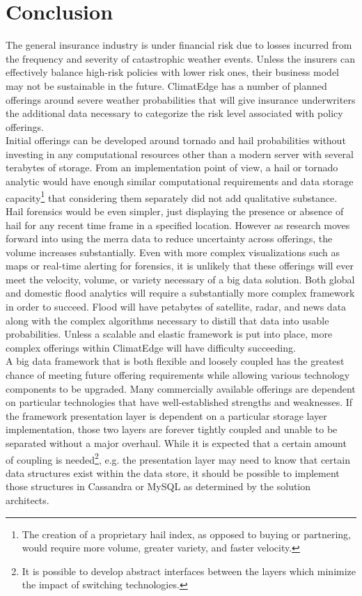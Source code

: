 \section{Conclusion}
The general insurance industry is under financial risk due to losses incurred from the frequency and severity of catastrophic weather events. Unless the insurers can effectively balance high-risk policies with lower risk ones, their business model may not be sustainable in the future. ClimatEdge has a number of planned offerings around severe weather probabilities that will give insurance underwriters the additional data necessary to categorize the risk level associated with policy offerings.\\

Initial offerings can be developed around tornado and hail probabilities without investing in any computational resources other than a modern server with several terabytes of storage. From an implementation point of view, a hail or tornado analytic would have enough similar computational requirements and data storage capacity\footnote{The creation of a proprietary hail index, as opposed to buying or partnering, would require more volume, greater variety, and faster velocity.} that considering them separately did not add qualitative substance. Hail forensics would be even simpler, just displaying the presence or absence of hail for any recent time frame in a specified location. However as research moves forward into using the \gls{merra} data to reduce uncertainty across offerings, the volume increases substantially. Even with more complex visualizations such as maps or real-time alerting for forensics, it is unlikely that these offerings will ever meet the velocity, volume, or variety necessary of a big data solution. Both global and domestic flood analytics will require a substantially more complex framework in order to succeed. Flood will have petabytes of satellite, radar, and news data along with the complex algorithms necessary to distill that data into usable probabilities. Unless a scalable and elastic framework is put into place, more complex offerings within ClimatEdge will have difficulty succeeding.\\

A big data framework that is both flexible and loosely coupled has the greatest chance of meeting future offering requirements while allowing various technology components to be upgraded. Many commercially available offerings are dependent on particular technologies that have well-established strengths and weaknesses. If the framework presentation layer is dependent on a particular storage layer implementation, those two layers are forever tightly coupled and unable to be separated without a major overhaul. While it is expected that a certain amount of coupling is needed\footnote{It is possible to develop abstract interfaces between the layers which minimize the impact of switching technologies.}, e.g. the presentation layer may need to know that certain data structures exist within the data store, it should be possible to implement those structures in Cassandra or MySQL as determined by the solution architects.\\

